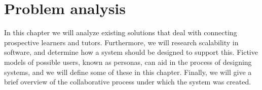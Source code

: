 \chapter{Problem analysis}
In this chapter we will analyze existing solutions that deal with connecting prospective learners and tutors.
Furthermore, we will research scalability in software, and determine how a system should be designed to support this.
Fictive models of possible users, known as personas, can aid in the process of designing systems, and we will define some of these in this chapter.
Finally, we will give a brief overview of the collaborative process under which the system was created.





